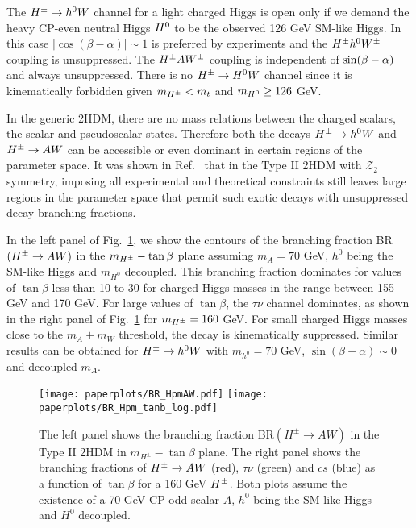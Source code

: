 The $H^{\pm} \to h^0 W$ channel for a light charged Higgs is open only if we demand the heavy CP-even neutral Higgs $H^0$  to  be the observed 126 GeV SM-like Higgs. In this case $|\cos(\beta-\alpha)| \sim 1$ is preferred by experiments and the $H^{\pm} h^0 W^{\pm}$ coupling is unsuppressed.  The $H^{\pm} A W^{\pm}$ coupling is independent of $\sin(\beta-\alpha)$ and always unsuppressed. There is no   $H^{\pm} \to H^0 W$ channel since it is kinematically forbidden given $m_{H^{\pm}}<m_t$ and $m_{H^0}\geq126$ GeV.

In the generic 2HDM, there are no mass relations between the charged scalars, the scalar and pseudoscalar states. Therefore both the decays $H^{\pm} \to h^0 W$ and $H^{\pm} \to A W$ can be accessible or even   dominant in certain regions of the parameter space. It was shown in Ref.~\cite{Coleppa:2013dya} that in the Type II 2HDM with $\mathcal{Z}_2$ symmetry, imposing all experimental and theoretical constraints still leaves large regions in the parameter space that permit such exotic decays with unsuppressed decay branching fractions. 

In the left panel of Fig.~\ref{fig:mod_BR_Hpm},   we show the contours of the branching fraction BR$(H^{\pm} \to A W)$  in the $m_{H^{\pm}}-\tan\beta$ plane assuming $m_A=70$ GeV, $h^0$ being the SM-like Higgs and $m_{H^0}$ decoupled. This branching fraction dominates for values of $\tan \beta$ less than 10 to 30 for charged Higgs masses in the range between 155 GeV and 170 GeV. For large values of $\tan\beta$,  the $\tau\nu$ channel dominates, as shown in the right panel of Fig.~\ref{fig:mod_BR_Hpm} for $m_{H^{\pm}}=160$ GeV. For small charged Higgs masses close to the $m_A + m_W$ threshold,  the decay is kinematically suppressed. Similar results can be obtained for $H^{\pm} \rightarrow h^0 W$ with $m_{h^0} = 70$ GeV, $\sin(\beta-\alpha)\sim 0$ and decoupled $m_A$. 

 \begin{figure}[h!]
 \centering
 	\texttt{[image: paperplots/BR\_HpmAW.pdf]}
 	\texttt{[image: paperplots/BR\_Hpm\_tanb\_log.pdf]}
\caption{The left panel shows the branching fraction BR$(  H^{\pm} \to AW)$ in the Type II 2HDM in $m_{H^\pm}-\tan\beta$ plane. The right panel shows the branching fractions of   $H^{\pm} \rightarrow AW$ (red), $\tau\nu$ (green) and $cs$ (blue) as a function of $\tan\beta$ for a 160 GeV $H^{\pm}$. Both plots assume the existence of a 70 GeV CP-odd scalar $A$, $h^0$ being the SM-like Higgs and $H^0$ decoupled.}
\label{fig:mod_BR_Hpm}
\end{figure}

